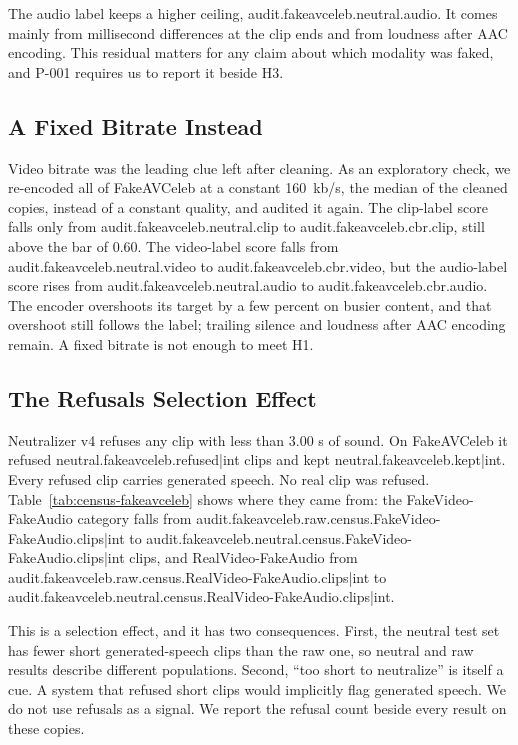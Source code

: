 The audio label keeps a higher ceiling, {{audit.fakeavceleb.neutral.audio}}.
It comes mainly from millisecond differences at the clip ends and from
loudness after AAC encoding. This residual matters for any claim about which
modality was faked, and P-001 requires us to report it beside H3.

\subsection{A Fixed Bitrate Instead}

Video bitrate was the leading clue left after cleaning. As an exploratory
check, we re-encoded all of FakeAVCeleb at a constant 160~kb/s, the median of
the cleaned copies, instead of a constant quality, and audited it again. The
clip-label score falls only from {{audit.fakeavceleb.neutral.clip}} to
{{audit.fakeavceleb.cbr.clip}}, still above the bar of 0.60. The video-label
score falls from {{audit.fakeavceleb.neutral.video}} to
{{audit.fakeavceleb.cbr.video}}, but the audio-label score rises from
{{audit.fakeavceleb.neutral.audio}} to {{audit.fakeavceleb.cbr.audio}}. The
encoder overshoots its target by a few percent on busier content, and that
overshoot still follows the label; trailing silence and loudness after AAC
encoding remain. A fixed bitrate is not enough to meet H1.

\subsection{The Refusals Selection Effect}
\label{sec:refusals}

Neutralizer v4 refuses any clip with less than 3.00 s of sound. On FakeAVCeleb
it refused {{neutral.fakeavceleb.refused|int}} clips and kept
{{neutral.fakeavceleb.kept|int}}. Every refused clip carries generated speech.
No real clip was refused. Table~\ref{tab:census-fakeavceleb} shows where they
came from: the FakeVideo-FakeAudio category falls from
{{audit.fakeavceleb.raw.census.FakeVideo-FakeAudio.clips|int}} to
{{audit.fakeavceleb.neutral.census.FakeVideo-FakeAudio.clips|int}} clips, and
RealVideo-FakeAudio from
{{audit.fakeavceleb.raw.census.RealVideo-FakeAudio.clips|int}} to
{{audit.fakeavceleb.neutral.census.RealVideo-FakeAudio.clips|int}}.

This is a selection effect, and it has two consequences. First, the neutral
test set has fewer short generated-speech clips than the raw one, so neutral
and raw results describe different populations. Second, ``too short to
neutralize'' is itself a cue. A system that refused short clips would
implicitly flag generated speech. We do not use refusals as a signal. We
report the refusal count beside every result on these copies.

